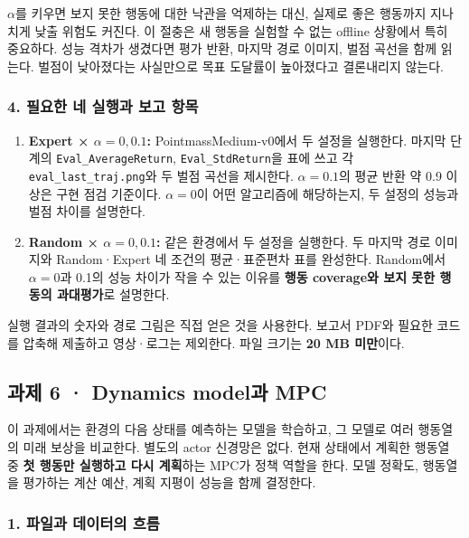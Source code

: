 \documentclass[11pt,a4paper]{article}
\begin{document}
$\alpha$를 키우면 보지 못한 행동에 대한 낙관을 억제하는 대신, 실제로 좋은 행동까지 지나치게 낮출 위험도 커진다. 이 절충은 새 행동을 실험할 수 없는 offline 상황에서 특히 중요하다. 성능 격차가 생겼다면 평가 반환, 마지막 경로 이미지, 벌점 곡선을 함께 읽는다. 벌점이 낮아졌다는 사실만으로 목표 도달률이 높아졌다고 결론내리지 않는다.\par

\subsubsection{4. 필요한 네 실행과 보고 항목}

\begin{enumerate}
\item \textbf{Expert × $\alpha=0,0.1$:} PointmassMedium-v0에서 두 설정을 실행한다. 마지막 단계의 \texttt{Eval\_\allowbreak{}AverageReturn}, \texttt{Eval\_\allowbreak{}StdReturn}을 표에 쓰고 각 \texttt{eval\_\allowbreak{}last\_\allowbreak{}traj.\allowbreak{}png}와 두 벌점 곡선을 제시한다. $\alpha=0.1$의 평균 반환 약 0.9 이상은 구현 점검 기준이다. $\alpha=0$이 어떤 알고리즘에 해당하는지, 두 설정의 성능과 벌점 차이를 설명한다.
\item \textbf{Random × $\alpha=0,0.1$:} 같은 환경에서 두 설정을 실행한다. 두 마지막 경로 이미지와 Random·Expert 네 조건의 평균·표준편차 표를 완성한다. Random에서 $\alpha=0$과 0.1의 성능 차이가 작을 수 있는 이유를 \textbf{행동 coverage와 보지 못한 행동의 과대평가}로 설명한다.
\end{enumerate}

실행 결과의 숫자와 경로 그림은 직접 얻은 것을 사용한다. 보고서 PDF와 필요한 코드를 압축해 제출하고 영상·로그는 제외한다. 파일 크기는 \textbf{20 MB 미만}이다.\par

\clearpage
\subsection{과제 6 · Dynamics model과 MPC}


이 과제에서는 환경의 다음 상태를 예측하는 모델을 학습하고, 그 모델로 여러 행동열의 미래 보상을 비교한다. 별도의 actor 신경망은 없다. 현재 상태에서 계획한 행동열 중 \textbf{첫 행동만 실행하고 다시 계획}하는 MPC가 정책 역할을 한다. 모델 정확도, 행동열을 평가하는 계산 예산, 계획 지평이 성능을 함께 결정한다.\par

\subsubsection{1. 파일과 데이터의 흐름}
\end{document}
